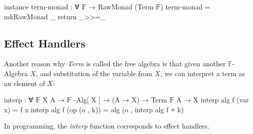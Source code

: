 \begin{code}[hide]
instance
  term-monad : ∀ {𝔽} → RawMonad (Term 𝔽)
  term-monad = mkRawMonad _ return _>>=_
\end{code}

\subsection{Effect Handlers}

Another reason why \textit{Term} is called the free algebra is that given another $\mathbb{F}$-Algebra $X$, and substitution of the variable from $X$, we can interpret a term as an element of $X$:
%
\begin{center}\begin{code}
interp : ∀ {𝔽} {X A} → 𝔽 -Alg[ X ] → (A → X) → Term 𝔽 A → X
interp alg f (var x)      = f x
interp alg f (op (o , k)) = alg (o , interp alg f ∘ k)
\end{code}\end{center}

In programming, the \textit{interp} function corresponds to effect handlers.
